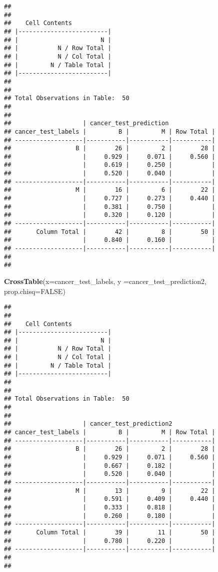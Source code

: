 \documentclass[]{article}
\newenvironment{Shaded}{\begin{snugshade}}{\end{snugshade}}
\newcommand{\KeywordTok}[1]{\textcolor[rgb]{0.13,0.29,0.53}{\textbf{#1}}}
\newcommand{\DataTypeTok}[1]{\textcolor[rgb]{0.13,0.29,0.53}{#1}}
\newcommand{\OtherTok}[1]{\textcolor[rgb]{0.56,0.35,0.01}{#1}}
\newcommand{\NormalTok}[1]{#1}
\begin{document}
\begin{verbatim}
## 
##  
##    Cell Contents
## |-------------------------|
## |                       N |
## |           N / Row Total |
## |           N / Col Total |
## |         N / Table Total |
## |-------------------------|
## 
##  
## Total Observations in Table:  50 
## 
##  
##                    | cancer_test_prediction 
## cancer_test_labels |         B |         M | Row Total | 
## -------------------|-----------|-----------|-----------|
##                  B |        26 |         2 |        28 | 
##                    |     0.929 |     0.071 |     0.560 | 
##                    |     0.619 |     0.250 |           | 
##                    |     0.520 |     0.040 |           | 
## -------------------|-----------|-----------|-----------|
##                  M |        16 |         6 |        22 | 
##                    |     0.727 |     0.273 |     0.440 | 
##                    |     0.381 |     0.750 |           | 
##                    |     0.320 |     0.120 |           | 
## -------------------|-----------|-----------|-----------|
##       Column Total |        42 |         8 |        50 | 
##                    |     0.840 |     0.160 |           | 
## -------------------|-----------|-----------|-----------|
## 
## 
\end{verbatim}

\begin{Shaded}
\begin{Highlighting}[]
\KeywordTok{CrossTable}\NormalTok{(}\DataTypeTok{x=}\NormalTok{cancer_test_labels, }\DataTypeTok{y =}\NormalTok{cancer_test_prediction2, }\DataTypeTok{prop.chisq=}\OtherTok{FALSE}\NormalTok{)}
\end{Highlighting}
\end{Shaded}

\begin{verbatim}
## 
##  
##    Cell Contents
## |-------------------------|
## |                       N |
## |           N / Row Total |
## |           N / Col Total |
## |         N / Table Total |
## |-------------------------|
## 
##  
## Total Observations in Table:  50 
## 
##  
##                    | cancer_test_prediction2 
## cancer_test_labels |         B |         M | Row Total | 
## -------------------|-----------|-----------|-----------|
##                  B |        26 |         2 |        28 | 
##                    |     0.929 |     0.071 |     0.560 | 
##                    |     0.667 |     0.182 |           | 
##                    |     0.520 |     0.040 |           | 
## -------------------|-----------|-----------|-----------|
##                  M |        13 |         9 |        22 | 
##                    |     0.591 |     0.409 |     0.440 | 
##                    |     0.333 |     0.818 |           | 
##                    |     0.260 |     0.180 |           | 
## -------------------|-----------|-----------|-----------|
##       Column Total |        39 |        11 |        50 | 
##                    |     0.780 |     0.220 |           | 
## -------------------|-----------|-----------|-----------|
## 
## 
\end{verbatim}
\end{document}
